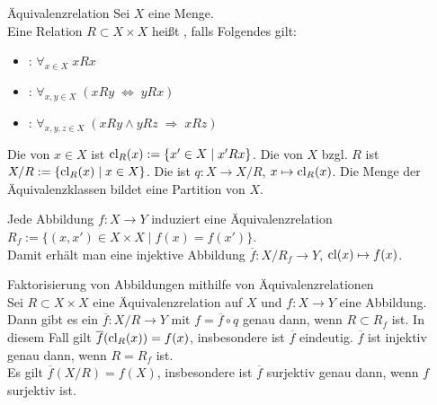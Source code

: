 \begin{Def}{Äquivalenzrelation}
    Sei $X$ eine Menge. \\
    Eine Relation $R \subset X \times X$ heißt ,
    falls Folgendes gilt:
    \begin{itemize}
        \item
        :
        $\forall_{x \in X}\; xRx$

        \item
        :
        $\forall_{x, y \in X}\; (xRy \;\Leftrightarrow\; yRx)$

        \item
        :
        $\forall_{x, y, z \in X}\; (xRy \land yRz \;\Rightarrow\; xRz)$
    \end{itemize}
    Die  von $x \in X$ ist
    $\operatorname{cl}_R(x) := \{x' \in X \;|\; x'Rx\}$.
    Die  von $X$ bzgl. $R$ ist
    $X/R := \{\operatorname{cl}_R(x) \;|\; x \in X\}$.
    Die  ist
    $q\colon X \rightarrow X/R$, $x \mapsto \operatorname{cl}_R(x)$.
    Die Menge der Äquivalenzklassen bildet eine Partition von $X$.
\end{Def}

\begin{Bem}
    Jede Abbildung $f\colon X \rightarrow Y$ induziert eine
    Äquivalenzrelation \\
    $R_f := \{(x, x') \in X \times X \;|\; f(x) = f(x')\}$. \\
    Damit erhält man eine injektive Abbildung
    $\overline{f}\colon X/R_f \rightarrow Y$, $\operatorname{cl}(x) \mapsto f(x)$.
\end{Bem}

\begin{Lemma}{Faktorisierung von Abbildungen mithilfe von
              Äquivalenzrelationen}\\
    Sei $R \subset X \times X$ eine Äquivalenzrelation auf $X$ und
    $f\colon X \rightarrow Y$ eine Abbildung.
    Dann gibt es ein $\overline{f}\colon X/R \rightarrow Y$ mit
    $f = \overline{f} \circ q$ genau dann, wenn $R \subset R_f$ ist.
    In diesem Fall gilt $\overline{f}(\operatorname{cl}_R(x)) = f(x)$, insbesondere ist
    $\overline{f}$ eindeutig.
    $\overline{f}$ ist injektiv genau dann, wenn $R = R_f$ ist. \\
    Es gilt $\overline{f}(X/R) = f(X)$, insbesondere ist
    $\overline{f}$ surjektiv genau dann, wenn $f$ surjektiv ist.
\end{Lemma}


